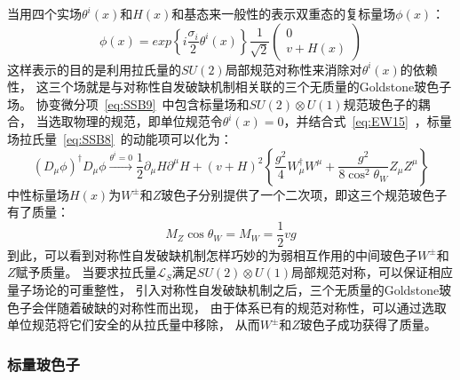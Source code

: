 当用四个实场$\theta^i(x)$和$H(x)$和基态来一般性的表示双重态的复标量场$\phi(x)$：
\begin{equation} 
\label{eq:SSB11}
\phi(x)=exp\left\{  i \frac{\sigma_i}{2}\theta^i(x)  \right\} \frac{1}{\sqrt{2}}
\left( \begin{array}{l} 0 \\  v+H(x) \end{array} \right)
\end{equation}
这样表示的目的是利用拉氏量的$SU(2)$局部规范对称性来消除对$\theta^i(x)$的依赖性，
这三个场就是与对称性自发破缺机制相关联的三个无质量的Goldstone玻色子场。
协变微分项~\ref{eq:SSB9}~中包含标量场和$SU(2)\otimes U(1)$规范玻色子的耦合，
当选取物理的规范，即单位规范令$\theta^i(x)=0$，并结合式~\ref{eq:EW15}~，标量场拉氏量~\ref{eq:SSB8}~的动能项可以化为：
\begin{equation} 
\label{eq:SSB12}
(D_{\mu}\phi)^{\dagger}D_{\mu}\phi \xrightarrow{\theta^i=0} \frac{1}{2} \partial_{\mu}H \partial^{\mu}H
+(v+H)^2\left\{    \frac{g^2}{4}W^{\dagger}_{\mu}W^{\mu} +\frac{g^2}{8\cos^2 \theta_W}Z_{\mu}Z^{\mu}    \right\}
\end{equation}
中性标量场$H(x)$为$W^{\pm}$和$Z$玻色子分别提供了一个二次项，即这三个规范玻色子有了质量：
\begin{equation} 
\label{eq:SSB13}
M_Z \cos \theta_W=M_W=\frac{1}{2}vg
\end{equation}
到此，可以看到对称性自发破缺机制怎样巧妙的为弱相互作用的中间玻色子$W^{\pm}$和$Z$赋予质量。
当要求拉氏量$\mathcal{L}_S$满足$SU(2)\otimes U(1)$局部规范对称，可以保证相应量子场论的可重整性，
引入对称性自发破缺机制之后，三个无质量的Goldstone玻色子会伴随着破缺的对称性而出现，
由于体系已有的规范对称性，可以通过选取单位规范将它们安全的从拉氏量中移除，
从而$W^{\pm}$和$Z$玻色子成功获得了质量。

\subsubsection{标量玻色子}
\label{sec:SSBH}

